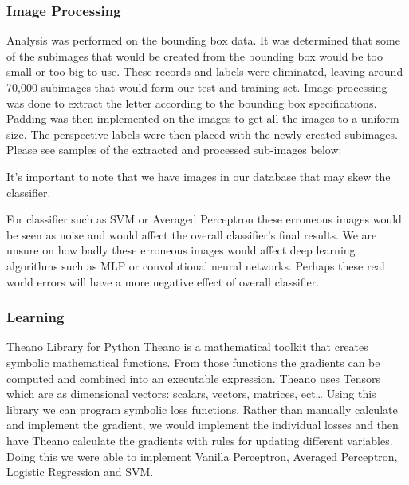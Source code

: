 \documentclass[11pt]{article}
\begin{document}
\subsubsection{Image Processing}
Analysis was performed on the bounding box data.  It was determined that some of the subimages that would be created from the bounding box would be too small or too big to use.  These records and labels were eliminated, leaving around 70,000 subimages that would form our  test and training set.  Image processing was done to extract the letter according to the bounding box specifications.  Padding was then implemented on the images to get all the images to a uniform size.  The perspective labels were then placed with the newly created subimages.  Please see samples of the extracted and processed sub-images below:

It’s important to note that we have images in our database that may skew the classifier.

For classifier such as SVM or Averaged Perceptron these erroneous images would be seen as noise and would affect the overall classifier's final results.  We are unsure on how badly these erroneous images would affect deep learning algorithms such as MLP or convolutional neural networks.   Perhaps these real world errors will have a more negative effect of overall classifier.

\subsubsection{Learning}
Theano Library for Python
Theano is a mathematical toolkit that creates symbolic mathematical functions.  From those functions the gradients can be computed and combined into an executable expression.  Theano uses Tensors which are as dimensional vectors: scalars, vectors, matrices, ect… Using this library we can program symbolic loss functions.  Rather than manually calculate and implement the gradient, we would implement the individual losses and then have Theano calculate the gradients with rules for updating different variables.  Doing this we were able to implement Vanilla Perceptron, Averaged Perceptron, Logistic Regression and SVM.
\end{document}

